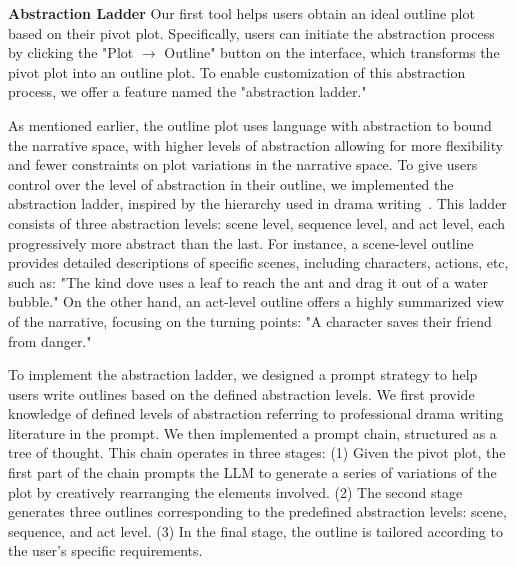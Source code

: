 \noindent\textbf{Abstraction Ladder} Our first tool helps users obtain an ideal outline plot based on their pivot plot. Specifically, users can initiate the abstraction process by clicking the "Plot $\rightarrow$ Outline" button on the interface, which transforms the pivot plot into an outline plot. To enable customization of this abstraction process, we offer a feature named the "abstraction ladder."


As mentioned earlier, the outline plot uses language with abstraction to bound the narrative space, with higher levels of abstraction allowing for more flexibility and fewer constraints on plot variations in the narrative space. To give users control over the level of abstraction in their outline, we implemented the abstraction ladder, inspired by the hierarchy used in drama writing~\cite{kennedy2013literature}. This ladder consists of three abstraction levels: scene level, sequence level, and act level, each progressively more abstract than the last. For instance, a scene-level outline provides detailed descriptions of specific scenes, including characters, actions, etc, such as: "The kind dove uses a leaf to reach the ant and drag it out of a water bubble." On the other hand, an act-level outline offers a highly summarized view of the narrative, focusing on the turning points: "A character saves their friend from danger."

To implement the abstraction ladder, we designed a prompt strategy to help users write outlines based on the defined abstraction levels. We first provide knowledge of defined levels of abstraction referring to professional drama writing literature in the prompt. We then implemented a prompt chain, structured as a tree of thought. This chain operates in three stages: (1) Given the pivot plot, the first part of the chain prompts the LLM to generate a series of variations of the plot by creatively rearranging the elements involved. (2)  The second stage generates three outlines corresponding to the predefined abstraction levels: scene, sequence, and act level. (3) In the final stage, the outline is tailored according to the user's specific requirements.



